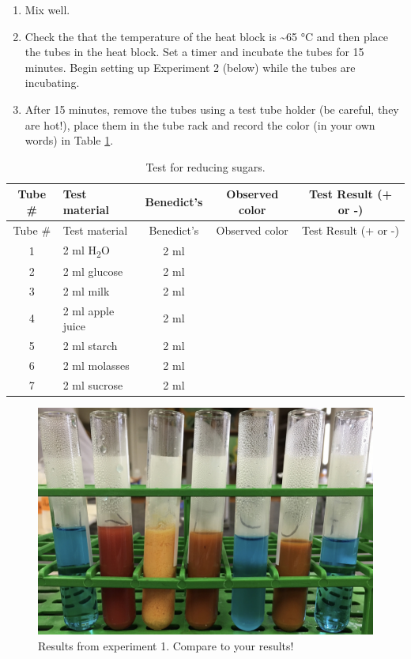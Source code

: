 \begin{enumerate}
\def\labelenumi{\arabic{enumi}.}
\setcounter{enumi}{5}
\tightlist
\item
  Mix well.
\item
  Check the that the temperature of the heat block is
  \textasciitilde{}65 °C and then place the tubes in the heat block. Set
  a timer and incubate the tubes for 15 minutes. Begin setting up
  Experiment 2 (below) while the tubes are incubating.
\item
  After 15 minutes, remove the tubes using a test tube holder (be
  careful, they are hot!), place them in the tube rack and record the
  color (in your own words) in Table \ref{tab:sugar}.
\end{enumerate}

\begin{longtable}[]{@{}clccc@{}}
\caption{\label{tab:sugar} Test for reducing sugars.}\tabularnewline
\toprule
Tube \# & Test material & Benedict's & Observed color & Test Result (+
or -)\tabularnewline
\midrule
\endfirsthead
\toprule
Tube \# & Test material & Benedict's & Observed color & Test Result (+
or -)\tabularnewline
\midrule
\endhead
1 & 2 ml H\textsubscript{2}O & 2 ml & &\tabularnewline
2 & 2 ml glucose & 2 ml & &\tabularnewline
3 & 2 ml milk & 2 ml & &\tabularnewline
4 & 2 ml apple juice & 2 ml & &\tabularnewline
5 & 2 ml starch & 2 ml & &\tabularnewline
6 & 2 ml molasses & 2 ml & &\tabularnewline
7 & 2 ml sucrose & 2 ml & &\tabularnewline
\bottomrule
\end{longtable}

\begin{figure}

{\centering \includegraphics[width=0.7\linewidth]{./figures/chem_aspects/Results_exp_1} 

}

\caption{Results from experiment 1. Compare to your results!}\label{fig:exp1}
\end{figure}
\pagebreak
